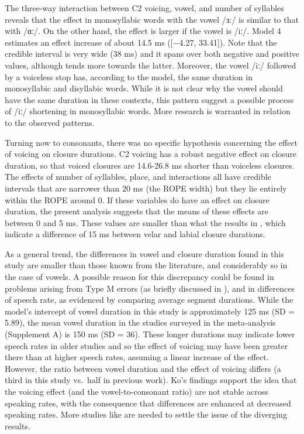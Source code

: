 \documentclass[
  12pt,
  a4paper,
  authoryear, 5p]{elsarticle}
\begin{document}
The three-way interaction between C2 voicing, vowel, and number of
syllables reveals that the effect in monosyllabic words with the vowel
/ɜː/ is similar to that with /ɑː/. On the other hand, the effect is
larger if the vowel is /iː/. Model 4 estimates an effect increase of
about 14.5 ms ({[}−4.27, 33.41{]}). Note that the credible interval is
very wide (38 ms) and it spans over both negative and positive values,
although tends more towards the latter. Moreover, the vowel /iː/
followed by a voiceless stop has, according to the model, the same
duration in monosyllabic and disyllabic words. While it is not clear why
the vowel should have the same duration in these contexts, this pattern
suggest a possible process of /iː/ shortening in monosyllabic words.
More research is warranted in relation to the observed patterns.

Turning now to consonants, there was no specific hypothesis concerning
the effect of voicing on closure durations. C2 voicing has a robust
negative effect on closure duration, so that voiced closures are
14.6-26.8 ms shorter than voiceless closures. The effects of number of
syllables, place, and interactions all have credible intervals that are
narrower than 20 ms (the ROPE width) but they lie entirely within the
ROPE around 0. If these variables do have an effect on closure duration,
the present analysis suggests that the means of these effects are
between 0 and 5 ms. These values are smaller than what the results in
\citet{sharf1962}, which indicate a difference of 15 ms between velar
and labial closure durations.

As a general trend, the differences in vowel and closure duration found
in this study are smaller than those known from the literature, and
considerably so in the case of vowels. A possible reason for this
discrepancy could be found in problems arising from Type M errors (as
briefly discussed in ), and in differences of speech rate,
as evidenced by comparing average segment durations. While the model's
intercept of vowel duration in this study is approximately 125 ms (SD =
5.89), the mean vowel duration in the studies surveyed in the
meta-analysis (Supplement A) is 150 ms (SD = 36). These longer durations
may indicate lower speech rates in older studies and so the effect of
voicing may have been greater there than at higher speech rates,
assuming a linear increase of the effect. However, the ratio between
vowel duration and the effect of voicing differs (a third in this study
vs.~half in previous work). Ko's findings \citeyear{ko2018} support the
idea that the voicing effect (and the vowel-to-consonant ratio) are not
stable across speaking rates, with the consequence that differences are
enhanced at decreased speaking rates. More studies like \citet{ko2018}
are needed to settle the issue of the diverging results.
\end{document}
